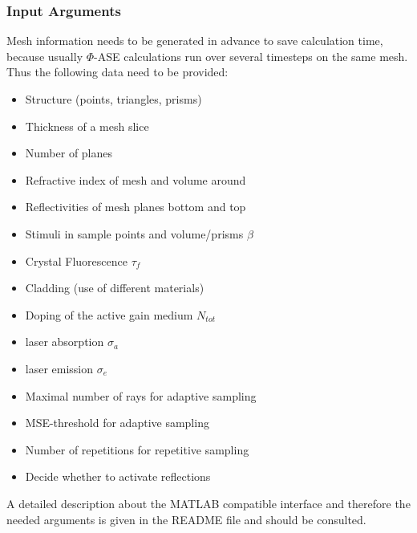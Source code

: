 \subsubsection{Input Arguments}
Mesh information needs to be generated in advance
to save calculation time, because usually $\Phi$-ASE calculations
run over several timesteps on the same mesh. Thus the following
data need to be provided:
\begin{description}
  \label{label:input}
  \item[Mesh information]\mbox{}
    \begin{itemize}
      \setlength{\itemindent}{-2.5em}
    \item Structure (points, triangles, prisms)
    \item Thickness of a mesh slice 
    \item Number of planes
    \item Refractive index of mesh and volume around
    \item Reflectivities of mesh planes bottom and top
    \end{itemize}

  \item[Properties]
    \mbox{}
    \begin{itemize}
      \setlength{\itemindent}{-2.5em}
      \item Stimuli in sample points and volume/prisms $\beta$
      \item Crystal Fluorescence $\tau_{f}$
      \item Cladding (use of different materials)
      \item Doping of the active gain medium $N_{tot}$
    \end{itemize}

  \item[Laser information]
    \mbox{}
    \begin{itemize}
      \setlength{\itemindent}{-2.5em}
      \item laser absorption $\sigma_a$
      \item laser emission $\sigma_e$
    \end{itemize}

   \item[Algorithm information]
    \mbox{}
    \begin{itemize}
      \setlength{\itemindent}{-2.5em}
       \item Maximal number of rays for adaptive sampling
       \item MSE-threshold for adaptive sampling
       \item Number of repetitions for repetitive sampling
       \item Decide whether to activate reflections
     \end{itemize}
    
 \end{description}
A detailed description about the MATLAB compatible interface
and therefore the needed arguments is given in the README file 
and should be consulted.

